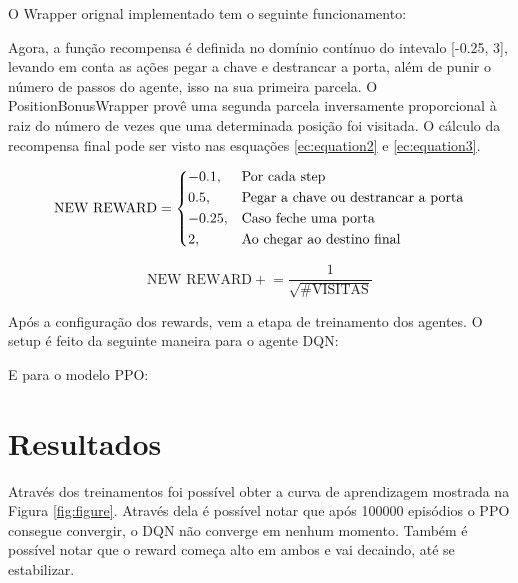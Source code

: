 \documentclass[9pt,a4paper,twoside]{tau}
\begin{document}
O Wrapper orignal implementado tem o seguinte funcionamento:


Agora, a função recompensa é definida no domínio contínuo do intevalo [-0.25, 3], levando em conta as ações pegar a chave e destrancar a porta, além de punir o número de passos do agente, isso na sua primeira parcela. O PositionBonusWrapper provê uma segunda parcela inversamente proporcional à raiz do número de vezes que uma determinada posição foi visitada. O cálculo da recompensa final pode ser visto nas esquações \ref{ec:equation2} e \ref{ec:equation3}.

\begin{equation}
    \label{ec:equation2}
    \text{NEW REWARD} =
    \begin{dcases}
      -0.1,                      & \text{Por cada step}                       \\
        0.5,                        & \text{Pegar a chave ou destrancar a porta}     \\
        -0.25,                      & \text{Caso feche uma porta}                       \\
        2,                          & \text{Ao chegar ao destino final}
    \end{dcases}
\end{equation}

\begin{equation}
    \label{ec:equation3}
   \text{NEW REWARD} +\!= \frac{1}{\sqrt{\text{\#VISITAS}}}
\end{equation}

Após a configuração dos rewards, vem a etapa de treinamento dos agentes. O setup é feito da seguinte maneira para o agente DQN:

E para o modelo PPO:


\section{Resultados}

Através dos treinamentos foi possível obter a curva de aprendizagem mostrada na Figura \ref{fig:figure}. Através dela é possível notar que após 100000 episódios o PPO consegue convergir, o DQN não converge em nenhum momento. Também é possível notar que o reward começa alto em ambos e vai decaindo, até se estabilizar.
\end{document}

